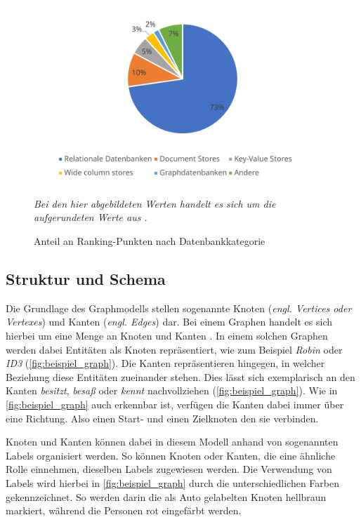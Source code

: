 \begin{figure}[ht]
    \centering
    \includegraphics[width=\textwidth]{images/dbms_marketshare.pdf}
    \caption[Anteil Ranking-Punkte nach Datenbankkategorie]{Anteil an Ranking-Punkten nach Datenbankkategorie}
    \label{fig:dbms_marketshare}
    \vspace{1em}
    \textit{Bei den hier abgebildeten Werten handelt es sich um die aufgerundeten Werte aus} \cite{db_engines_ranking_july}\textit{.}
\end{figure}

\subsection{Struktur und Schema}
\label{datenmodelle:structure}
Die Grundlage des Graphmodells stellen sogenannte Knoten (\textit{engl. Vertices oder Vertexes}) und Kanten (\textit{engl. Edges}) dar. Bei einem Graphen handelt es sich hierbei um eine Menge an Knoten und Kanten \cite{gdbms}. In einem solchen Graphen werden dabei Entitäten als Knoten repräsentiert, wie zum Beispiel \textit{Robin} oder \textit{ID3} (\autoref{fig:beispiel_graph}). Die Kanten repräsentieren hingegen, in welcher Beziehung diese Entitäten zueinander stehen. Dies lässt sich exemplarisch an den Kanten \textit{besitzt}, \textit{besaß} oder \textit{kennt} nachvollziehen (\autoref{fig:beispiel_graph}). Wie in \autoref{fig:beispiel_graph} auch erkennbar ist, verfügen die Kanten dabei immer über eine Richtung. Also einen Start- und einen Zielknoten den sie verbinden. 

Knoten und Kanten können dabei in diesem Modell anhand von sogenannten Labels organisiert werden. So können Knoten oder Kanten, die eine ähnliche Rolle einnehmen, dieselben Labels zugewiesen werden. Die Verwendung von Labels wird hierbei in \autoref{fig:beispiel_graph} durch die unterschiedlichen Farben gekennzeichnet. So werden darin die als Auto gelabelten Knoten hellbraun markiert, während die Personen rot eingefärbt werden. 

